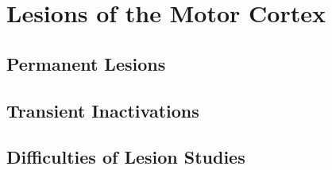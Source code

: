 \section{Lesions of the Motor Cortex}

\subsection{Permanent Lesions}

\subsection{Transient Inactivations}

\subsection{Difficulties of Lesion Studies}
